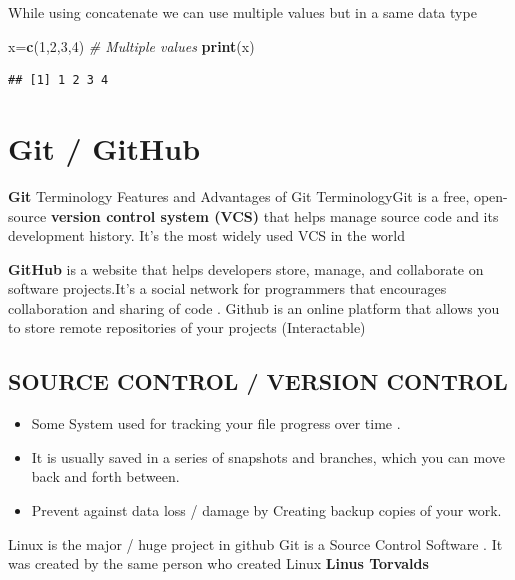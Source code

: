 \documentclass[
]{article}
\newenvironment{Shaded}{\begin{snugshade}}{\end{snugshade}}
\newcommand{\CommentTok}[1]{\textcolor[rgb]{0.56,0.35,0.01}{\textit{#1}}}
\newcommand{\DecValTok}[1]{\textcolor[rgb]{0.00,0.00,0.81}{#1}}
\newcommand{\FunctionTok}[1]{\textcolor[rgb]{0.13,0.29,0.53}{\textbf{#1}}}
\newcommand{\NormalTok}[1]{#1}
\newcommand{\OtherTok}[1]{\textcolor[rgb]{0.56,0.35,0.01}{#1}}
\providecommand{\tightlist}{%
  \setlength{\itemsep}{0pt}\setlength{\parskip}{0pt}}
\begin{document}
While using concatenate we can use multiple values but in a same data
type

\begin{Shaded}
\begin{Highlighting}[]
\NormalTok{ x}\OtherTok{=}\FunctionTok{c}\NormalTok{(}\DecValTok{1}\NormalTok{,}\DecValTok{2}\NormalTok{,}\DecValTok{3}\NormalTok{,}\DecValTok{4}\NormalTok{) }\CommentTok{\# Multiple values}
\FunctionTok{print}\NormalTok{(x)}
\end{Highlighting}
\end{Shaded}

\begin{verbatim}
## [1] 1 2 3 4
\end{verbatim}

\newpage

\section{Git / GitHub}\label{git-github}

\textbf{Git} Terminology Features and Advantages of Git TerminologyGit
is a free, open-source \textbf{version control system (VCS)} that helps
manage source code and its development history. It's the most widely
used VCS in the world

\textbf{GitHub} is a website that helps developers store, manage, and
collaborate on software projects.It's a social network for programmers
that encourages collaboration and sharing of code . Github is an online
platform that allows you to store remote repositories of your projects
(Interactable)

\subsection{SOURCE CONTROL / VERSION
CONTROL}\label{source-control-version-control}

\begin{itemize}
\tightlist
\item
  Some System used for tracking your file progress over time .
\item
  It is usually saved in a series of snapshots and branches, which you
  can move back and forth between.
\item
  Prevent against data loss / damage by Creating backup copies of your
  work.
\end{itemize}

Linux is the major / huge project in github Git is a Source Control
Software . It was created by the same person who created Linux
\textbf{Linus Torvalds}
\end{document}
